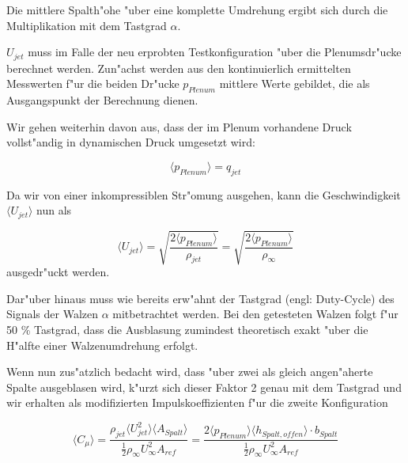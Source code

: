 Die mittlere Spalth"ohe "uber eine komplette Umdrehung ergibt sich durch die Multiplikation mit dem Tastgrad $\alpha$.


$U_{jet}$ muss im Falle der neu erprobten Testkonfiguration "uber die Plenumsdr"ucke berechnet werden.
Zun"achst werden aus den kontinuierlich ermittelten Messwerten f"ur die beiden Dr"ucke $p_{Plenum}$ mittlere Werte gebildet, die als Ausgangspunkt der Berechnung dienen.

Wir gehen weiterhin davon aus, dass der im Plenum vorhandene Druck vollst"andig in dynamischen Druck umgesetzt wird:

	\begin{equation}
	\label{eq:Annahme q}
		\langle{p_{Plenum}}\rangle = q_{jet}
	\end{equation}

Da wir  von einer inkompressiblen Str"omung ausgehen, kann die Geschwindigkeit $\langle{U_{jet}}\rangle$ nun als
	
	\begin{equation}
	\label{eq:jetgeschwindigkeit}
		\langle{U_{jet}}\rangle = \sqrt{\frac{2 \langle{p_{Plenum}}\rangle}{\rho_{jet}}} = \sqrt{\frac{2 \langle{p_{Plenum}}\rangle}{\rho_{\infty}}}
	\end{equation}
ausgedr"uckt werden.

Dar"uber hinaus muss wie bereits erw"ahnt der Tastgrad (engl: Duty-Cycle) des Signals der Walzen $\alpha$  mitbetrachtet werden.
Bei den getesteten Walzen folgt f"ur 50 \% Tastgrad, dass die Ausblasung zumindest theoretisch exakt "uber die H"alfte einer Walzenumdrehung erfolgt.

Wenn nun zus"atzlich bedacht wird, dass "uber zwei als gleich angen"aherte Spalte ausgeblasen wird, k"urzt sich dieser Faktor 2 genau mit dem Tastgrad und wir erhalten als modifizierten Impulskoeffizienten f"ur die zweite Konfiguration

	\begin{equation}
	\label{eq:momentum-coeff-oscill-final}
		\langle{C_{\mu}}\rangle = \frac{\rho_{jet}\langle{U^2_{jet}}\rangle \langle{A_{Spalt}}\rangle} {\frac{1}{2}\rho_{\infty}U^2_{\infty}A_{ref}} = \frac{2\langle{p_{Plenum}}\rangle \langle{h_{Spalt,offen}}\rangle \cdot b_{Spalt}} {\frac{1}{2}\rho_{\infty}U^2_{\infty}A_{ref}}
	\end{equation}


